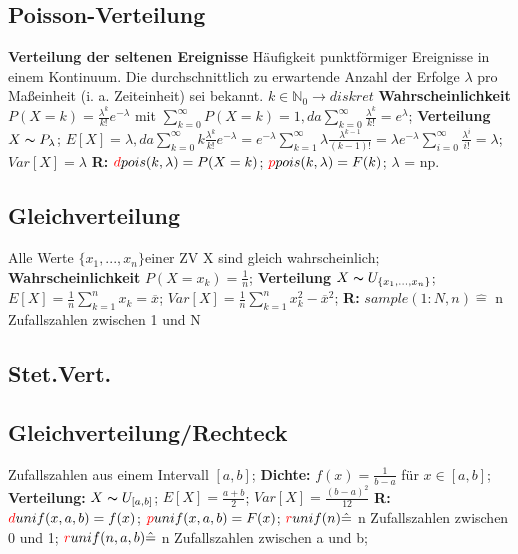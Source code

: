 \subsection{Poisson-Verteilung}
\textbf{Verteilung der seltenen Ereignisse} Häufigkeit punktförmiger Ereignisse in einem Kontinuum. Die durchschnittlich zu erwartende Anzahl der Erfolge $\lambda$ pro Maßeinheit (i. a. Zeiteinheit) sei bekannt. $k \in \mathbb{N}_{0} \rightarrow diskret$
\textbf{Wahrscheinlichkeit}$P (X = k) = \frac{\lambda^k}{k!}e^{-\lambda}$ mit $ \sum_{k=0}^{\infty} P(X=k) = 1, da \sum_{k=0}^{\infty} \frac{\lambda^k}{k!} = e^{\lambda}$; 
\textbf{Verteilung} $X \thicksim P_{\lambda}$; 
$E[X] = \lambda, da \sum_{k=0}^{\infty} k\frac{\lambda^k}{k!} e^{-\lambda} = e^{-\lambda}\sum_{k=1}^{\infty}\lambda \frac{\lambda^{k-1}}{(k-1)!} = \lambda e^{-\lambda} \sum_{i=0}^{\infty} \frac{\lambda^i}{i!} = \lambda$; 
$Var[X] = \lambda$ 
\textbf{R:} 
$\textcolor{red}{d}pois(k,\lambda)=P(X=k)$; 
$\textcolor{red}{p}pois(k,\lambda)=F(k)$; 
$ \lambda $ = np.
\subsection{Gleichverteilung}
Alle Werte $\{x_{1},...,x_{n}\}$einer ZV X sind gleich wahrscheinlich; 
\textbf{Wahrscheinlichkeit} 
$P(X=x_{k}) = \frac{1}{n}$; 
\textbf{Verteilung} 
$X \thicksim U_{\{x_{1}, ..., x_{n}\}}$; 
$E[X] = \frac{1}{n} \sum_{k=1}^{n} x_{k} = \overline{x}$; 
$Var[X] = \frac{1}{n} \sum_{k=1}^{n} x_{k}^2 - \overline{x}^2$; 
\textbf{R:} 
$sample(1:N,n) \hat{=}$ n Zufallszahlen zwischen 1 und N
\subsection{Stet.Vert.}
\subsection{Gleichverteilung/Rechteck}
Zufallszahlen aus einem Intervall $[a,b]$; 
\textbf{Dichte:} 
$f(x) = \frac{1}{b-a}$ für $x \in [a,b]$; 
\textbf{Verteilung:} 
$X \thicksim U_{[a,b]}$; 
$E[X] = \frac{a+b}{2}$; 
$Var[X] = \frac{(b-a)^2}{12}$
\textbf{R:} 
$\textcolor{red}{d}unif(x,a,b)=f(x)$; 
$\textcolor{red}{p}unif(x,a,b)=F(x)$; 
$\textcolor{red}{r}unif(n) \hat{=}$ n Zufallszahlen zwischen 0 und 1; 
$\textcolor{red}{r}unif(n, a, b) \hat{=}$ n Zufallszahlen zwischen a und b; 
